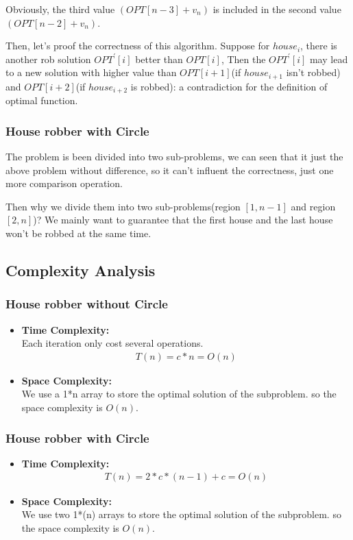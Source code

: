 \documentclass[UTF8,a4paper,12pt]{article}
\begin{document}
\begin{CJK}{UTF8}{gkai}
		Obviously, the third  value $ (OPT[n-3] + v_{n}) $ is included in the second value $ (OPT[n-2] + v_{n}) $.
		
		
		Then, let's proof the correctness of this algorithm. Suppose for $ house_{i} $, there is another rob solution $ OPT^{'}[i] $ better than $ OPT[i] $, Then the $ OPT^{'}[i] $ may lead to a new solution with higher value than $ OPT[i+1]$(if $ house_{i+1} $ isn't robbed) and $ OPT[i+2]$(if $ house_{i+2} $ is robbed): a contradiction for the definition of optimal function.
		
	\subsubsection{House robber with Circle}
		The problem is been divided into two sub-problems, we can seen that it just the above problem without difference, so it can't influent the correctness, just one more comparison operation.
		
		Then why we divide them into two sub-problems(region $ [1,n-1] $ and region $ [2,n] $)? We mainly want to guarantee that the first house and the last house won’t be robbed at the same time.  
	
	\subsection{Complexity Analysis}
	\subsubsection{House robber without Circle}
	\begin{itemize}
		
		\item{\textbf{Time Complexity:}} \\
		Each iteration only cost several operations.
		\begin{align*}
			T(n) = c*n
			=O(n)
		\end{align*}
		\item{\textbf{Space Complexity:}}\\
		We use a 1*n array to store the optimal solution of the subproblem. so the space complexity is $ O(n) $.
	\end{itemize}
	\subsubsection{House robber with Circle}
	\begin{itemize}
		\item{\textbf{Time Complexity:}} 
		\begin{align*}
		T(n) = 2*c*(n-1)+c=O(n)
		\end{align*}
		\item{\textbf{Space Complexity:}}\\
		We use two 1*(n) arrays to store the optimal solution of the subproblem. so the space complexity is $ O(n) $.
	\end{itemize}






\end{CJK}
\end{document}
